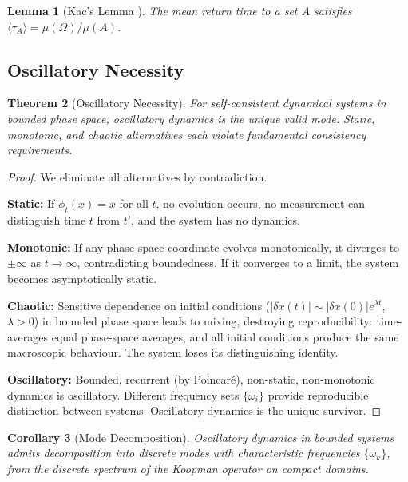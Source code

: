 \documentclass[11pt,twocolumn,a4paper]{article}
\newtheorem{theorem}{Theorem}[section]
\newtheorem{lemma}[theorem]{Lemma}
\newtheorem{corollary}[theorem]{Corollary}
\theoremstyle{definition}
\theoremstyle{remark}
\begin{document}
\begin{lemma}[Kac's Lemma {\citep{kac1947}}]
\label{lem:kac}
The mean return time to a set $A$ satisfies $\langle \tau_A \rangle = \mu(\Omega)/\mu(A)$.
\end{lemma}

\subsection{Oscillatory Necessity}

\begin{theorem}[Oscillatory Necessity]
\label{thm:oscillatory}
For self-consistent dynamical systems in bounded phase space, oscillatory dynamics is the unique valid mode. Static, monotonic, and chaotic alternatives each violate fundamental consistency requirements.
\end{theorem}

\begin{proof}
We eliminate all alternatives by contradiction.

\textbf{Static:} If $\phi_t(x) = x$ for all $t$, no evolution occurs, no measurement can distinguish time $t$ from $t'$, and the system has no dynamics.

\textbf{Monotonic:} If any phase space coordinate evolves monotonically, it diverges to $\pm\infty$ as $t \to \infty$, contradicting boundedness. If it converges to a limit, the system becomes asymptotically static.

\textbf{Chaotic:} Sensitive dependence on initial conditions ($|\delta x(t)| \sim |\delta x(0)| e^{\lambda t}$, $\lambda > 0$) in bounded phase space leads to mixing, destroying reproducibility: time-averages equal phase-space averages, and all initial conditions produce the same macroscopic behaviour. The system loses its distinguishing identity.

\textbf{Oscillatory:} Bounded, recurrent (by Poincar\'e), non-static, non-monotonic dynamics is oscillatory. Different frequency sets $\{\omega_i\}$ provide reproducible distinction between systems. Oscillatory dynamics is the unique survivor.
\end{proof}

\begin{corollary}[Mode Decomposition]
\label{cor:modes}
Oscillatory dynamics in bounded systems admits decomposition into discrete modes with characteristic frequencies $\{\omega_k\}$, from the discrete spectrum of the Koopman operator \citep{koopman1931} on compact domains.
\end{corollary}
\end{document}
